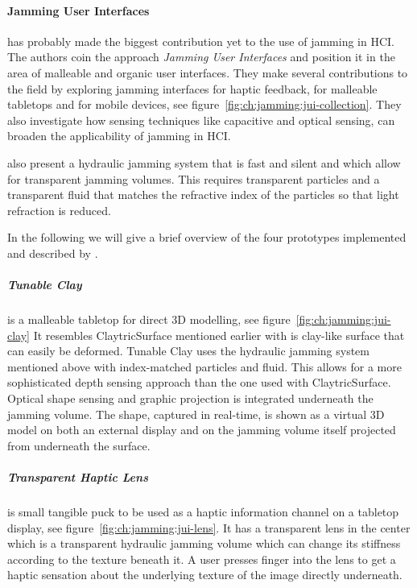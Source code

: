 \paragraph{Jamming User Interfaces}
\label{ch:jamming:related-work:hci:jui} 
\citet{follmer2012jamming} has probably made the biggest contribution yet to the use of jamming in HCI. 
The authors coin the approach \textit{Jamming User Interfaces} and position it in the area of malleable and organic user interfaces. 
They make several contributions to the field by exploring jamming interfaces for haptic feedback, for malleable tabletops and for mobile devices, see figure~\ref{fig:ch:jamming:jui-collection}. 
They also investigate how sensing techniques like capacitive and optical sensing, can broaden the applicability of jamming in HCI. 

\citet{follmer2012jamming} also present a hydraulic jamming system that is fast and silent and which allow for transparent jamming volumes. 
This requires transparent particles and a transparent fluid that matches the refractive index of the particles so that light refraction is reduced. 


In the following we will give a brief overview of the four prototypes implemented and described by \citet{follmer2012jamming}.

\subparagraph{Tunable Clay} is a malleable tabletop for direct 3D modelling, see figure~\ref{fig:ch:jamming:jui-clay}
It resembles ClaytricSurface \citep{matoba2012claytricsurface} mentioned earlier with is clay-like surface that can easily be deformed.
Tunable Clay uses the hydraulic jamming system mentioned above with index-matched particles and fluid.
This allows for a more sophisticated depth sensing approach than the one used with ClaytricSurface.
Optical shape sensing and graphic projection is integrated underneath the jamming volume.
The shape, captured in real-time, is shown as a virtual 3D model on both an external display and on the jamming volume itself projected from underneath the surface.

\subparagraph{Transparent Haptic Lens} is small tangible puck to be used as a haptic information channel on a tabletop display, see figure~\ref{fig:ch:jamming:jui-lens}.
It has a transparent lens in the center which is a transparent hydraulic jamming volume which can change its stiffness according to the texture beneath it.
A user presses  finger into the lens to get a haptic sensation about the underlying texture of the image directly underneath. 

